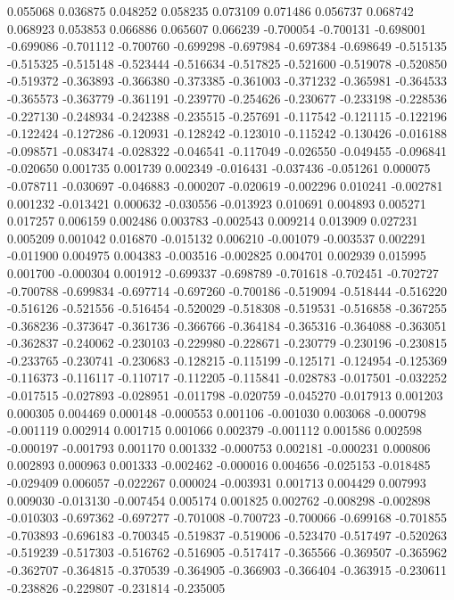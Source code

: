 0.055068
0.036875
0.048252
0.058235
0.073109
0.071486
0.056737
0.068742
0.068923
0.053853
0.066886
0.065607
0.066239
-0.700054
-0.700131
-0.698001
-0.699086
-0.701112
-0.700760
-0.699298
-0.697984
-0.697384
-0.698649
-0.515135
-0.515325
-0.515148
-0.523444
-0.516634
-0.517825
-0.521600
-0.519078
-0.520850
-0.519372
-0.363893
-0.366380
-0.373385
-0.361003
-0.371232
-0.365981
-0.364533
-0.365573
-0.363779
-0.361191
-0.239770
-0.254626
-0.230677
-0.233198
-0.228536
-0.227130
-0.248934
-0.242388
-0.235515
-0.257691
-0.117542
-0.121115
-0.122196
-0.122424
-0.127286
-0.120931
-0.128242
-0.123010
-0.115242
-0.130426
-0.016188
-0.098571
-0.083474
-0.028322
-0.046541
-0.117049
-0.026550
-0.049455
-0.096841
-0.020650
0.001735
0.001739
0.002349
-0.016431
-0.037436
-0.051261
0.000075
-0.078711
-0.030697
-0.046883
-0.000207
-0.020619
-0.002296
0.010241
-0.002781
0.001232
-0.013421
0.000632
-0.030556
-0.013923
0.010691
0.004893
0.005271
0.017257
0.006159
0.002486
0.003783
-0.002543
0.009214
0.013909
0.027231
0.005209
0.001042
0.016870
-0.015132
0.006210
-0.001079
-0.003537
0.002291
-0.011900
0.004975
0.004383
-0.003516
-0.002825
0.004701
0.002939
0.015995
0.001700
-0.000304
0.001912
-0.699337
-0.698789
-0.701618
-0.702451
-0.702727
-0.700788
-0.699834
-0.697714
-0.697260
-0.700186
-0.519094
-0.518444
-0.516220
-0.516126
-0.521556
-0.516454
-0.520029
-0.518308
-0.519531
-0.516858
-0.367255
-0.368236
-0.373647
-0.361736
-0.366766
-0.364184
-0.365316
-0.364088
-0.363051
-0.362837
-0.240062
-0.230103
-0.229980
-0.228671
-0.230779
-0.230196
-0.230815
-0.233765
-0.230741
-0.230683
-0.128215
-0.115199
-0.125171
-0.124954
-0.125369
-0.116373
-0.116117
-0.110717
-0.112205
-0.115841
-0.028783
-0.017501
-0.032252
-0.017515
-0.027893
-0.028951
-0.011798
-0.020759
-0.045270
-0.017913
0.001203
0.000305
0.004469
0.000148
-0.000553
0.001106
-0.001030
0.003068
-0.000798
-0.001119
0.002914
0.001715
0.001066
0.002379
-0.001112
0.001586
0.002598
-0.000197
-0.001793
0.001170
0.001332
-0.000753
0.002181
-0.000231
0.000806
0.002893
0.000963
0.001333
-0.002462
-0.000016
0.004656
-0.025153
-0.018485
-0.029409
0.006057
-0.022267
0.000024
-0.003931
0.001713
0.004429
0.007993
0.009030
-0.013130
-0.007454
0.005174
0.001825
0.002762
-0.008298
-0.002898
-0.010303
-0.697362
-0.697277
-0.701008
-0.700723
-0.700066
-0.699168
-0.701855
-0.703893
-0.696183
-0.700345
-0.519837
-0.519006
-0.523470
-0.517497
-0.520263
-0.519239
-0.517303
-0.516762
-0.516905
-0.517417
-0.365566
-0.369507
-0.365962
-0.362707
-0.364815
-0.370539
-0.364905
-0.366903
-0.366404
-0.363915
-0.230611
-0.238826
-0.229807
-0.231814
-0.235005
